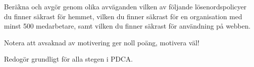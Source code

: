 \documentclass[a4paper,11pt,addpoints]{miunexam}
\begin{document}
\begin{questions}


	\question[24]\label{xrc:Passwords}
		Beräkna och avgör genom olika avväganden vilken av följande 
		lösenordspolicyer du finner säkrast för hemmet,
		vilken du finner säkrast för en organisation med minst 500 medarbetare,
		samt vilken du finner säkrast för användning på webben.
		Notera att avsaknad av motivering ger noll poäng, motivera väl!

	\question[24]\label{xrc:PDCA}
		Redogör grundligt för alla stegen i PDCA.

\end{questions}


\end{document}
